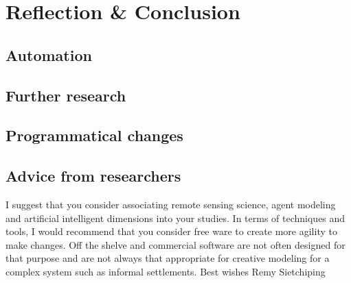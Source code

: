 
\chapter{Reflection \& Conclusion} %
\label{Chapter5} %


\section{Automation}
\section{Further research}
\section{Programmatical changes}

\section{Advice from researchers}
I suggest that you consider associating remote sensing science, agent modeling  and artificial intelligent dimensions into your studies. In terms of techniques and tools, I would recommend that you consider free ware to create more agility to make changes. Off the shelve and commercial software are not often designed for that purpose and are not always that appropriate for creative modeling for a complex system such as informal settlements. 
Best wishes
Remy Sietchiping